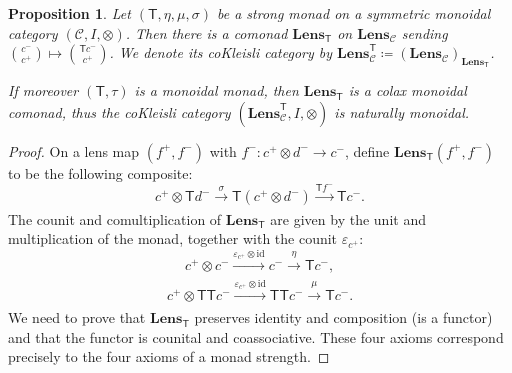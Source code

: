\documentclass[11pt, oneside, article]{memoir}
\theoremstyle{definition}
\theoremstyle{plain}
\newtheorem{proposition}[proposition]{Proposition}
\newcommand{\cat}[1]{\mathcal{#1}}%
\newcommand{\Cat}[1]{\mathbf{#1}}%
\newcommand{\Fun}[1]{\mathsf{#1}}%
\newcommand{\id}{\mathrm{id}}
\newcommand{\then}{\mathbin{\fatsemi}}
\newcommand{\To}[2][]{\xrightarrow[#1]{#2}}
\newcommand{\Lens}[1]{\Cat{Lens}_{#1}}
\newcommand{\inpt}[1]{#1^{-}}
\newcommand{\outp}[1]{#1^{+}}
\newcommand{\lensob}[1]{\binom{\inpt{#1}}{\outp{#1}}}%
\begin{document}
\begin{proposition}\label{prop.backward_comonad}
Let $(\Fun{T},\eta,\mu,\sigma)$ be a strong monad on a symmetric monoidal category $(\cat{C},I,\otimes)$. Then there is a comonad $\Lens{\Fun{T}}$ on $\Lens{\cat{C}}$ sending $\lensob{c}\mapsto \binom{\Fun{T}\inpt c}{\outp c}$. We denote its coKleisli category by $\Lens{\cat{C}}^{\Fun{T}}\coloneqq(\Lens{\cat{C}})_{\Lens{\Fun T}}$. 

If moreover $(\Fun{T},\tau)$ is a monoidal monad, then $\Lens{\Fun T}$ is a colax monoidal comonad, thus the coKleisli category $(\Lens{\cat{C}}^{\Fun{T}},I,\otimes)$ is naturally monoidal.
\end{proposition}
\begin{proof}
On a lens map $(\outp f,\inpt f)$ with $\inpt f\colon\outp c\otimes\inpt d\to\inpt c$, define $\Lens{\Fun T}(\outp f,\inpt f)$ to be the following composite:
\begin{equation}\label{eqn.lens_T_morphism}
\outp c\otimes\Fun{T}\inpt d\To{\sigma}\Fun{T}(\outp c\otimes\inpt d)\To{\Fun{T}\inpt f}\Fun{T}\inpt c.
\end{equation}
The counit and comultiplication of $\Lens{\Fun{T}}$ are given by the unit and multiplication of the monad, together with the counit $\varepsilon_{\outp c}$:
\begin{equation}\label{eqn.lens_T_counit}
\outp c\otimes\inpt c\To{\varepsilon_{\outp c}\otimes\id}\inpt c\To{\eta}\Fun{T}\inpt c,
\end{equation}
\begin{equation}\label{eqn.lens_T_comult}
\outp c\otimes\Fun{T}\Fun{T}\inpt c\To{\varepsilon_{\outp c}\otimes\id}\Fun{T}\Fun{T}\inpt c\To{\mu}\Fun{T}\inpt c.
\end{equation}
We need to prove that $\Lens{\Fun{T}}$ preserves identity and composition (is a functor) and that the functor is counital and coassociative. These four axioms correspond precisely to the four axioms of a monad strength.


\end{proof}
\end{document}
